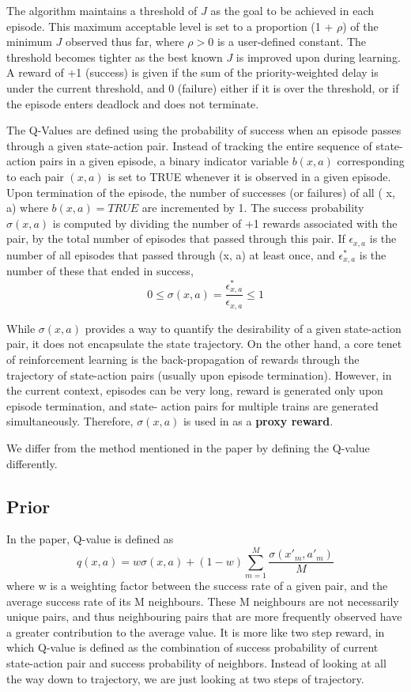 The algorithm maintains a threshold of $J$ as the goal to be
achieved in each episode. This maximum acceptable level is
set to a proportion (1 + $\rho$) of the minimum $J$ observed thus
far, where $\rho > 0$ is a user-defined constant. The threshold
becomes tighter as the best known $J$ is improved upon during
learning. A reward of +1 (success) is given if the sum of the
priority-weighted delay is under the current threshold, and 0
(failure) either if it is over the threshold, or if the episode
enters deadlock and does not terminate.

\vspace{\baselineskip}
The Q-Values
are defined using the probability of success when an episode
passes through a given state-action pair. Instead of tracking
the entire sequence of state-action pairs in a given episode,
a binary indicator variable $b( x, a)$ corresponding to each pair
$( x, a)$ is set to TRUE whenever it is observed in a given
episode. Upon termination of the episode, the number of
successes (or failures) of all ( x, a) where $b( x, a) = TRUE$
are incremented by 1. The success probability $\sigma ( x, a)$ is
computed by dividing the number of +1 rewards associated
with the pair, by the total number of episodes that passed
through this pair. If $\epsilon_{x,a}$ is the number of all episodes that
passed through (x, a) at least once, and $\epsilon^{*}_{x,a}$ is the number of these 
that ended in success,
$$ 0 \leq \sigma(x,a) = \frac{\epsilon^{*}_{x,a}}{\epsilon_{x,a}} \leq 1$$

While $ \sigma ( x, a)$ provides a way to quantify the desirability
of a given state-action pair, it does not encapsulate the state
trajectory. On the other hand, a core tenet of reinforcement
learning is the back-propagation of rewards through the trajectory of state-action pairs (usually
upon episode termination).
However, in the current context, episodes can be very long,
reward is generated only upon episode termination, and state-
action pairs for multiple trains are generated simultaneously.
Therefore, $\sigma ( x, a)$ is used in as a \textbf{proxy reward}\cite{ARTICLE:1}.

We differ from the method mentioned in the paper by defining the Q-value differently.

\subsection{Prior}
In the paper, Q-value is defined as 
$$ q(x,a) = w\sigma(x,a) + (1-w)\sum_{m=1}^{M}\frac{\sigma(x'_m, a'_m)}{M }  $$
where w is a weighting factor between the success rate of a given pair, 
and the average success rate of its M neighbours. These M neighbours are not necessarily unique pairs, and thus 
neighbouring pairs that are more frequently observed have a greater contribution to the average value. 
 It is more like two step reward, in which Q-value is defined as the combination of success 
probability of current state-action pair and success probability of neighbors. Instead of looking at 
all the way down to trajectory, we are just looking at two steps of trajectory.

